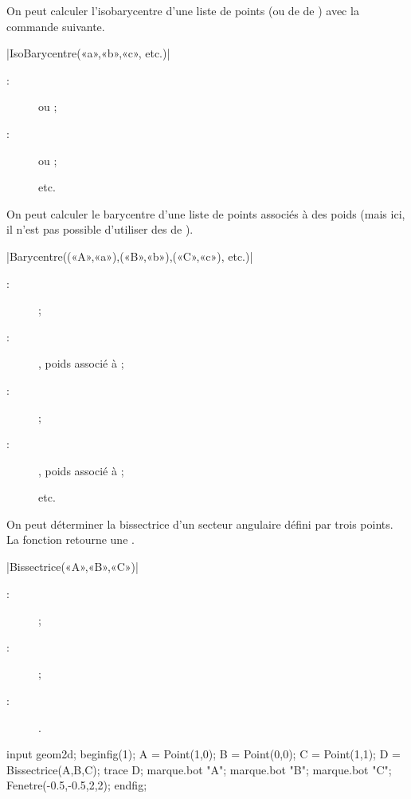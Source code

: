 \documentclass[a4paper,french]{article}
\begin{document}
On peut calculer l'isobarycentre d'une liste de points (ou de  de \MP) avec la commande suivante.
\begin{colourband}
\macro|IsoBarycentre(«a»,«b»,«c», etc.)|
\begin{description}
  \item[:]  ou ;
  \item[:]  ou  ;
  \item[] etc.
\end{description}
\end{colourband}

On peut calculer le barycentre d'une liste de points associés à des poids (mais
ici, il n'est pas possible d'utiliser des  de \MP).
\begin{colourband}
\macro|Barycentre((«A»,«a»),(«B»,«b»),(«C»,«c»), etc.)|
\begin{description}
  \item[:]  ;
  \item[:] , poids associé à  ;
  \item[:]  ;
  \item[:] , poids associé à  ;
  \item[] etc.
\end{description}
\end{colourband}


On peut déterminer la bissectrice d'un secteur angulaire défini par trois
points. La fonction retourne une .
\begin{colourband}
\macro|Bissectrice(«A»,«B»,«C»)|
\begin{description}
  \item[:]  ;
  \item[:]  ;
  \item[:] .
\end{description}
\end{colourband}

\begin{ExempleMP}
input geom2d;
beginfig(1);
A = Point(1,0);
B = Point(0,0);
C = Point(1,1);
D = Bissectrice(A,B,C);
trace D;
marque.bot "A";
marque.bot "B";
marque.bot "C";
Fenetre(-0.5,-0.5,2,2);
endfig;
\end{ExempleMP}
\end{document}

